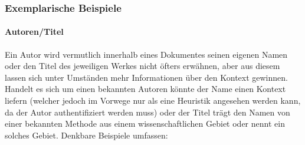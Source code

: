 \subsubsection{Exemplarische Beispiele}
\paragraph*{Autoren/Titel}%
%
%
%
Ein Autor wird vermutlich innerhalb eines Dokumentes seinen eigenen Namen oder den Titel des jeweiligen Werkes nicht öfters erwähnen, aber aus diesem lassen sich unter Umständen mehr Informationen über den Kontext gewinnen. Handelt es sich um einen bekannten Autoren könnte der Name einen Kontext liefern (welcher jedoch im Vorwege nur als eine Heuristik angesehen werden kann, da der Autor authentifiziert werden muss) oder der Titel trägt den Namen von einer bekannten Methode aus einem wissenschaftlichen Gebiet oder nennt ein solches Gebiet. Denkbare Beispiele umfassen:\ 
